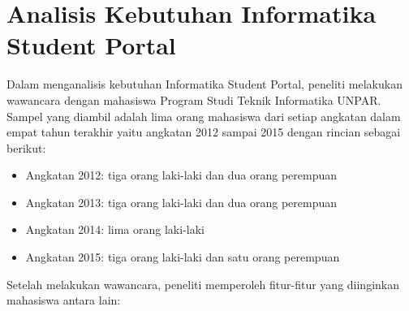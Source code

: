 \section{Analisis Kebutuhan Informatika Student Portal}
\label{sec:kebutuhan}
Dalam menganalisis kebutuhan Informatika Student Portal, peneliti melakukan wawancara dengan mahasiswa Program Studi Teknik Informatika UNPAR. Sampel yang diambil adalah lima orang mahasiswa dari setiap angkatan dalam empat tahun terakhir yaitu angkatan 2012 sampai 2015 dengan rincian sebagai berikut:
\begin{itemize}
	\item Angkatan 2012: tiga orang laki-laki dan dua orang perempuan
	\item Angkatan 2013: tiga orang laki-laki dan dua orang perempuan
	\item Angkatan 2014: lima orang laki-laki 
	\item Angkatan 2015: tiga orang laki-laki dan satu orang perempuan
\end{itemize}
 Setelah melakukan wawancara, peneliti memperoleh fitur-fitur yang diinginkan mahasiswa antara lain:
